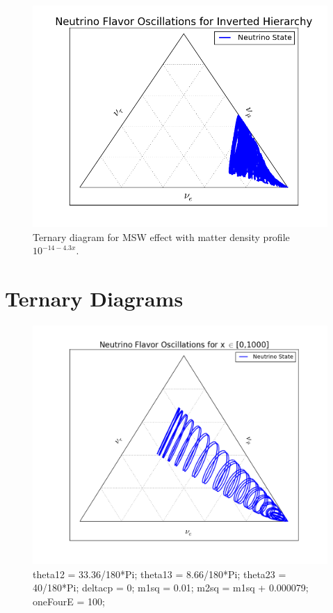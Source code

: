 \documentclass{tufte-handout}
\begin{document}
\begin{figure}
\centering
\includegraphics{assets/ternary/matter-minus14-1.png}
\caption{Ternary diagram for MSW effect with matter density profile $10^{-14 - 4.3 x}$.}
\label{fig:ternary-mass-1}
\end{figure}







\section{Ternary Diagrams}



\begin{figure}
\centering
\includegraphics{assets/ternary/1000-1}
\caption{ 
theta12 = 33.36/180*Pi;\newline
theta13 = 8.66/180*Pi;\newline
theta23 = 40/180*Pi;\newline
deltacp = 0;\newline
m1sq = 0.01;\newline
m2sq = m1sq + 0.000079;\newline
oneFourE = 100; 
}
\end{figure}
\end{document}
